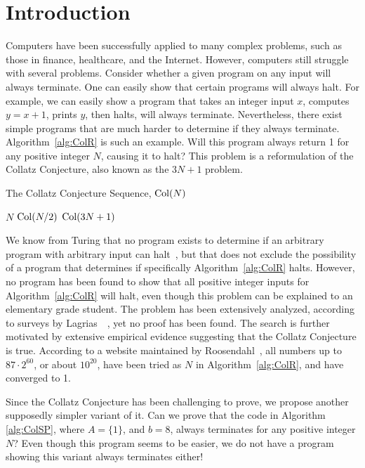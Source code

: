\chapter{Introduction} \label{sec:introduction}
Computers have been successfully applied to many complex problems, such as those in finance, healthcare, and the Internet. However, computers still struggle with several problems. Consider whether a given program on any input will always terminate. One can easily show that certain programs will always halt. For example, we can easily show a program that takes an integer input $x$, computes $y=x+1$, prints $y$, then halts, will always terminate. Nevertheless, there exist simple programs that are much harder to determine if they always terminate. Algorithm~\ref{alg:ColR} is such an example. Will this program always return 1 for any positive integer $N$, causing it to halt? This problem is a reformulation of the Collatz Conjecture, also known as the $3N+1$ problem. \par
\begin{algorithm} 
\caption{The Collatz Conjecture Sequence, $\mathrm{Col}(N)$}
\label{alg:ColR} 
\begin{algorithmic}[1]
     \Return $N$ 
    \EndIf
     \Return $\mathrm{Col}(N/2)$
    \EndIf
    \State \Return $\mathrm{Col}(3N + 1)$ 
\end{algorithmic}
\end{algorithm}
We know from Turing that no program exists to determine if an arbitrary program with arbitrary input can halt~\cite{Turing1936}, but that does not exclude the possibility of a program that determines if specifically Algorithm~\ref{alg:ColR} halts. However, no program has been found to show that all positive integer inputs for Algorithm~\ref{alg:ColR} will halt, even though this problem can be explained to an elementary grade student. The problem has been extensively analyzed, according to surveys by Lagrias~\cite{2003mathLagrais}~\cite{2006mathLagrias}, yet no proof has been found. The search is further motivated by extensive empirical evidence suggesting that the Collatz Conjecture is true. According to a website maintained by Roosendahl~\cite{EricRoose}, all numbers up to $87 \cdot 2^{60}$, or about $10^{20}$, have been tried as $N$ in Algorithm~\ref{alg:ColR}, and have converged to 1. \par
Since the Collatz Conjecture has been challenging to prove, we propose another supposedly simpler variant of it. Can we prove that the code in Algorithm \ref{alg:ColSP}, where $A = \{1\}$, and $b = 8$, always terminates for any positive integer $N$? Even though this program seems to be easier, we do not have a program showing this variant always terminates either! \par
